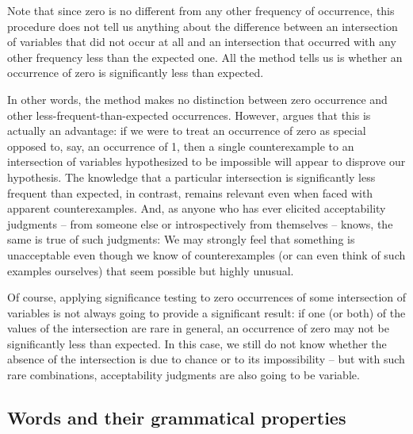 Note that since zero is no different from any other frequency  of occurrence, this procedure does not tell us anything about the difference between an intersection of variables that did not occur at all and an intersection that occurred with any other frequency less than the expected  one. All the method tells us is whether an occurrence of zero is significantly less than expected.

In other words, the method makes no distinction between zero occurrence and other less\hyp{}frequent\hyp{}than\hyp{}expected  occurrences. However, \citet[70f]{stefanowitsch_negative_2006} argues that this is actually an advantage: if we were to treat an occurrence of zero as special opposed to, say, an occurrence of 1, then a single counterexample  to an intersection of variables hypothesized to be impossible will appear to disprove our hypothesis. The knowledge that a particular intersection is significantly less frequent than expected, in contrast, remains relevant even when faced with apparent counterexamples.  And, as anyone who has ever elicited  acceptability  judgments -- from someone else or introspectively  from themselves -- knows, the same is true of such judgments: We may strongly feel that something is unacceptable even though we know of counterexamples (or can even think of such examples ourselves) that seem possible but highly unusual.\largerpage

Of course, applying significance testing to zero occurrences of some intersection of variables is not always going to provide a significant result: if one (or both) of the values of the intersection are rare in general, an occurrence of zero may not be significantly less than expected.  In this case, we still do not know whether the absence of the intersection is due to chance  or to its impossibility -- but with such rare combinations, acceptability  judgments are also going to be variable.

\subsection{Words and their grammatical properties}\label{sec:wordsandtheirgrammaticalproperties}\largerpage

